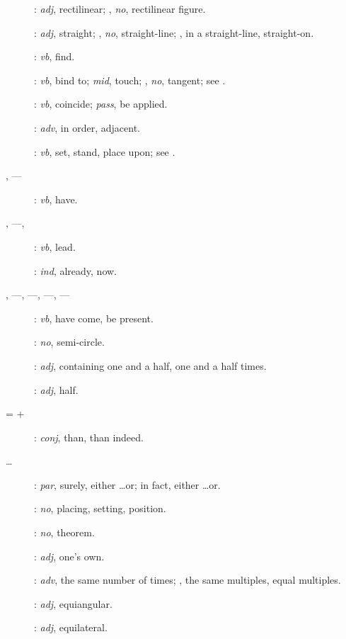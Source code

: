 {\begin{description}
\item[]: {\em adj}, rectilinear; , {\em no}, rectilinear figure.
\item[]: {\em adj}, straight; , {\em no}, straight-line; , in
a straight-line, straight-on.
\item[]:
{\em vb}, find.
\item[]: {\em vb}, bind to; {\em mid}, touch; , {\em no}, tangent; see .
\item[] : {\em vb}, coincide;  {\em pass},  be applied.
\item[]: {\em adv}, in order, adjacent.
\item[]: {\em vb}, set, stand, place upon; see .
\item[, ---]: {\em vb}, have.
\item[, ---, ]: {\em vb}, lead.
\item[]: {\em ind}, already, now.
\item[, ---,  ---, ---, ---]: {\em vb}, have come, be present.
\item[]: {\em no}, semi-circle.
\item[]: {\em adj}, containing one and a half, one and
a half times.
\item[]: {\em adj}, half.
\item[ =  + ]: {\em conj}, than, than indeed.
\item[ \ldots{}]: {\em par},   surely, either \ldots or; 
in fact, either \ldots or.
\item[]: {\em no}, placing, setting, position.
\item[]: {\em no}, theorem.
\item[]: {\em adj}, one's own.
\item[]: {\em adv}, the same number of times; , the same multiples, equal multiples.
\item[]: {\em adj}, equiangular.
\item[]: {\em adj}, equilateral.

\end{description}}
